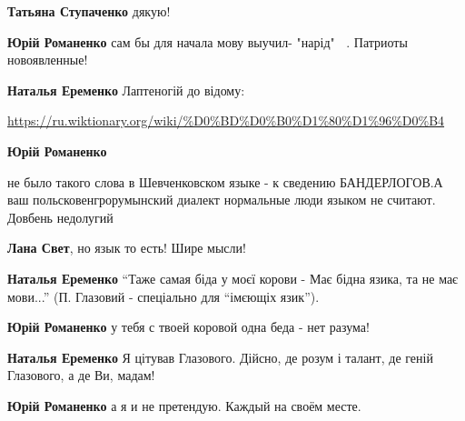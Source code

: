 \begin{itemize}
\begin{itemize}
\textbf{Татьяна Ступаченко} дякую!

\textbf{Юрій Романенко} сам бы для начала мову выучил- "нарід" 🥺😂. Патриоты новоявленные!

\textbf{Наталья Еременко} Лаптеногій до відому:\par
\url{https://ru.wiktionary.org/wiki/%D0%BD%D0%B0%D1%80%D1%96%D0%B4}

\textbf{Юрій Романенко} 

не было такого слова в Шевченковском языке - к сведению БАНДЕРЛОГОВ.А ваш
польсковенгрорумынский диалект нормальные люди языком не считают. Довбень
недолугий 🤣🤣🤣


\textbf{Лана Свет}, но язык то есть! Шире мысли!

\textbf{Наталья Еременко} \enquote{Таже самая біда у моєї корови -
Має бідна язика, та не має мови...} (П. Глазовий - спеціально для \enquote{імєющіх язик}).

\textbf{Юрій Романенко} у тебя с твоей коровой одна беда - нет разума!🤣

\textbf{Наталья Еременко} Я цітував Глазового. Дійсно, де розум і талант, де геній Глазового, а де Ви, мадам!

\textbf{Юрій Романенко} а я и не претендую. Каждый на своём месте.

\end{itemize}

\end{itemize}

